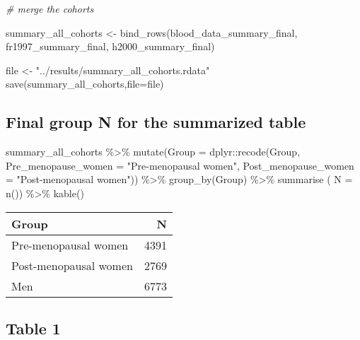 \documentclass[
]{article}
\newenvironment{Shaded}{\begin{snugshade}}{\end{snugshade}}
\newcommand{\AttributeTok}[1]{\textcolor[rgb]{0.77,0.63,0.00}{#1}}
\newcommand{\CommentTok}[1]{\textcolor[rgb]{0.56,0.35,0.01}{\textit{#1}}}
\newcommand{\FunctionTok}[1]{\textcolor[rgb]{0.00,0.00,0.00}{#1}}
\newcommand{\NormalTok}[1]{#1}
\newcommand{\OtherTok}[1]{\textcolor[rgb]{0.56,0.35,0.01}{#1}}
\newcommand{\SpecialCharTok}[1]{\textcolor[rgb]{0.00,0.00,0.00}{#1}}
\newcommand{\StringTok}[1]{\textcolor[rgb]{0.31,0.60,0.02}{#1}}
\begin{document}
\begin{Shaded}
\begin{Highlighting}[]
\CommentTok{\# merge the cohorts}

\NormalTok{summary\_all\_cohorts }\OtherTok{\textless{}{-}} \FunctionTok{bind\_rows}\NormalTok{(blood\_data\_summary\_final, fr1997\_summary\_final, h2000\_summary\_final)}

\NormalTok{file }\OtherTok{\textless{}{-}} \StringTok{"../results/summary\_all\_cohorts.rdata"}
\FunctionTok{save}\NormalTok{(summary\_all\_cohorts,}\AttributeTok{file=}\NormalTok{file)}
\end{Highlighting}
\end{Shaded}

\hypertarget{final-group-n-for-the-summarized-table}{%
\subsection{Final group N for the summarized
table}\label{final-group-n-for-the-summarized-table}}

\begin{Shaded}
\begin{Highlighting}[]
\NormalTok{summary\_all\_cohorts }\SpecialCharTok{\%\textgreater{}\%} 
   \FunctionTok{mutate}\NormalTok{(}\AttributeTok{Group =}\NormalTok{ dplyr}\SpecialCharTok{::}\FunctionTok{recode}\NormalTok{(Group, }\AttributeTok{Pre\_menopause\_women =} \StringTok{"Pre{-}menopausal women"}\NormalTok{,}
         \AttributeTok{Post\_menopause\_women =} \StringTok{"Post{-}menopausal women"}\NormalTok{)) }\SpecialCharTok{\%\textgreater{}\%} 
  \FunctionTok{group\_by}\NormalTok{(Group) }\SpecialCharTok{\%\textgreater{}\%} 
  \FunctionTok{summarise}\NormalTok{ ( }\AttributeTok{N =} \FunctionTok{n}\NormalTok{()) }\SpecialCharTok{\%\textgreater{}\%} 
  \FunctionTok{kable}\NormalTok{() }
\end{Highlighting}
\end{Shaded}

\begin{tabular}{l|r}
\hline
Group & N\\
\hline
Pre-menopausal women & 4391\\
\hline
Post-menopausal women & 2769\\
\hline
Men & 6773\\
\hline
\end{tabular}

\hypertarget{table-1}{%
\subsection{Table 1}\label{table-1}}
\end{document}
